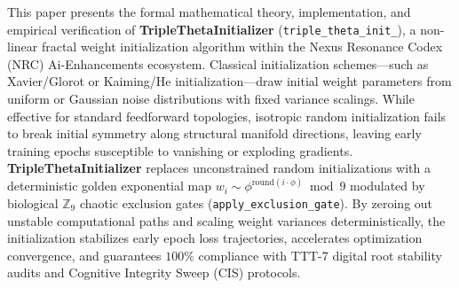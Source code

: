 \begin{abstractbox}
This paper presents the formal mathematical theory, implementation, and empirical verification of \textbf{TripleThetaInitializer} (\texttt{triple\_theta\_init\_}), a non-linear fractal weight initialization algorithm within the Nexus Resonance Codex (NRC) Ai-Enhancements ecosystem. Classical initialization schemes—such as Xavier/Glorot or Kaiming/He initialization—draw initial weight parameters from uniform or Gaussian noise distributions with fixed variance scalings. While effective for standard feedforward topologies, isotropic random initialization fails to break initial symmetry along structural manifold directions, leaving early training epochs susceptible to vanishing or exploding gradients. \textbf{TripleThetaInitializer} replaces unconstrained random initializations with a deterministic golden exponential map $w_i \sim \phi^{\text{round}(i \cdot \phi)} \bmod 9$ modulated by biological $\mathbb{Z}_9$ chaotic exclusion gates (\texttt{apply\_exclusion_gate}). By zeroing out unstable computational paths and scaling weight variances deterministically, the initialization stabilizes early epoch loss trajectories, accelerates optimization convergence, and guarantees $100\%$ compliance with TTT-7 digital root stability audits and Cognitive Integrity Sweep (CIS) protocols.
\end{abstractbox}
